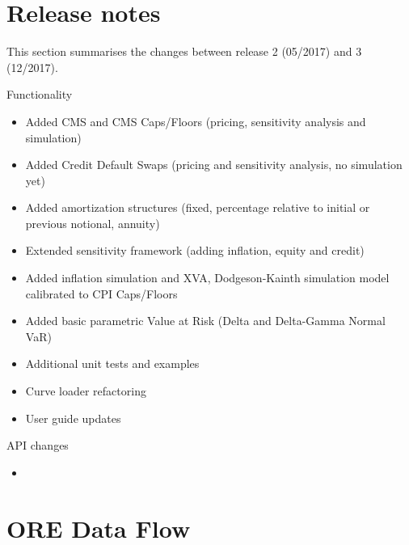 \documentclass[12pt, a4paper]{article}
\begin{document}
\section{Release notes}\label{sec:releasenotes}

This section summarises the changes between release 2 (05/2017) and 3 (12/2017).

\medskip
Functionality 
\begin{itemize}
\item Added CMS and CMS Caps/Floors (pricing, sensitivity analysis and simulation)
\item Added Credit Default Swaps (pricing and sensitivity analysis, no simulation yet)
\item Added amortization structures (fixed, percentage relative to initial or previous notional, annuity)
\item Extended sensitivity framework (adding inflation, equity and credit) 
\item Added inflation simulation and XVA, Dodgeson-Kainth simulation model calibrated to CPI Caps/Floors
\item Added basic parametric Value at Risk (Delta and Delta-Gamma Normal VaR)
\item Additional unit tests and examples
\item Curve loader refactoring
\item User guide updates
\end{itemize}

\medskip
API changes
\begin{itemize}
\item 
\end{itemize}


\section{ORE Data Flow}\label{sec:process}
\end{document}

